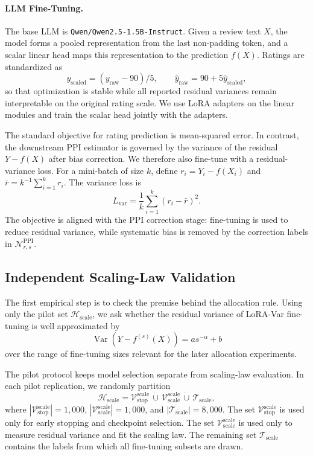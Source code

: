 \documentclass[11pt]{article}
\newcommand{\Var}{\operatorname{Var}}
\begin{document}
\paragraph{LLM Fine-Tuning.}
The base LLM is \texttt{Qwen/Qwen2.5-1.5B-Instruct}. Given a review text $X$, the model forms a
pooled representation from the last non-padding token, and a scalar linear head maps this
representation to the prediction $f(X)$. Ratings are standardized as
\[
    y_{\mathrm{scaled}}=(y_{\mathrm{raw}}-90)/5,
    \qquad
    \hat y_{\mathrm{raw}}=90+5\hat y_{\mathrm{scaled}},
\]
so that optimization is stable while all reported residual variances remain interpretable on the
original rating scale. We use LoRA adapters on the linear modules and train the scalar head
jointly with the adapters.

The standard objective for rating prediction is mean-squared error. In contrast, the downstream
PPI estimator is governed by the variance of the residual $Y-f(X)$ after bias correction. We
therefore also fine-tune with a residual-variance loss. For a mini-batch of size $k$, define
$r_i=Y_i-f(X_i)$ and $\bar r=k^{-1}\sum_{i=1}^k r_i$. The variance loss is
\[
    L_{\mathrm{var}}=\frac{1}{k}\sum_{i=1}^k(r_i-\bar r)^2.
\]
The objective is aligned with the PPI correction stage: fine-tuning is used to reduce residual
variance, while systematic bias is removed by the correction labels in
$\mathcal{N}_{r,s}^{\mathrm{PPI}}$.

\subsection{Independent Scaling-Law Validation}
\label{subsec:independent_scaling_law}

The first empirical step is to check the premise behind the allocation rule. Using only the
pilot set $\mathcal{H}_{\mathrm{scale}}$, we ask whether the residual variance of LoRA-Var
fine-tuning is well approximated by
\[
    \Var\!\left(Y-f^{(s)}(X)\right)=a s^{-\alpha}+b
\]
over the range of fine-tuning sizes relevant for the later allocation experiments.

The pilot protocol keeps model selection separate from scaling-law evaluation. In each pilot
replication, we randomly partition
\[
    \mathcal{H}_{\mathrm{scale}}
    =
    \mathcal{V}_{\mathrm{stop}}^{\mathrm{scale}}
    \,\dot\cup\,
    \mathcal{V}_{\mathrm{scale}}^{\mathrm{scale}}
    \,\dot\cup\,
    \mathcal{T}_{\mathrm{scale}},
\]
where
$|\mathcal{V}_{\mathrm{stop}}^{\mathrm{scale}}|=1{,}000$,
$|\mathcal{V}_{\mathrm{scale}}^{\mathrm{scale}}|=1{,}000$, and
$|\mathcal{T}_{\mathrm{scale}}|=8{,}000$. The set
$\mathcal{V}_{\mathrm{stop}}^{\mathrm{scale}}$ is used only for early stopping and checkpoint
selection. The set $\mathcal{V}_{\mathrm{scale}}^{\mathrm{scale}}$ is used only to measure
residual variance and fit the scaling law. The remaining set $\mathcal{T}_{\mathrm{scale}}$
contains the labels from which all fine-tuning subsets are drawn.
\end{document}
